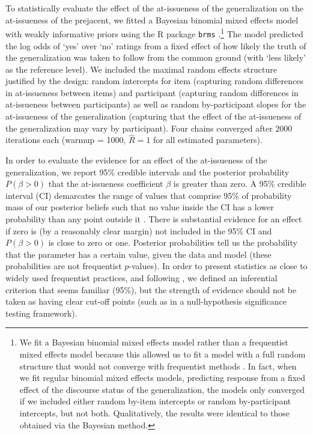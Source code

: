 \documentclass[11pt,fleqn]{article}
\newcommand{\6}{\mbox{$[\hspace*{-.6mm}[$}}
\newcommand{\9}{\mbox{$]\hspace*{-.6mm}]$}}
\begin{document}
To statistically evaluate the effect of the at-issueness of the generalization on the at-issueness of the prejacent, we fitted a Bayesian binomial mixed effects model with weakly informative priors using the R package \verb|brms| \citep{buerkner2017}.\footnote{We fit a Bayesian binomial mixed effects model rather than a frequentist mixed effects model because this allowed us to fit a model with a full random structure that would not converge with frequentist
methods \citep{Nicenboim2016}. In fact, when we fit regular binomial mixed effects models, predicting response from a fixed effect of the discourse status of the generalization, the models only converged if we included either random by-item intercepts or random by-participant intercepts, but not both. Qualitatively, the results were identical to those obtained via the Bayesian method.} The model predicted the log odds of `yes' over `no' ratings from a fixed effect of how likely the truth of the generalization was taken to follow from the common ground (with `less likely' as the reference level). We included the maximal random effects structure justified by the design: random intercepts for item (capturing random differences in at-issueness between items) and participant (capturing random differences in at-issueness between participants) as well as random by-participant slopes for the at-issueness of the generalization (capturing that the effect of the at-issueness of the generalization may vary by participant). Four chains converged after 2000 iterations each (warmup = 1000, \(\hat{R}=1\) for all estimated parameters).

In order to evaluate the evidence for an effect of the at-issueness of the generalization, we report 95\% credible intervals and the posterior probability $P(\beta > 0)$ that the at-issueness coefficient $\beta$ is greater than zero. A 95\% credible interval (CI) demarcates the range of values that comprise 95\% of probability mass of our posterior beliefs such that no value inside the CI has a lower probability than any point outside it \citep{Jaynes1976, Morey2016}. There is substantial evidence for an effect if zero is (by a reasonably clear margin) not included in the 95\% CI and $P(\beta > 0)$ is close to zero or one. Posterior probabilities tell us the probability that the parameter has a certain value, given the data and model (these probabilities are not frequentist $p$-values). In order to present statistics as close to widely used frequentist practices, and following \citealt{Nicenboim2016}, we defined an inferential criterion that seems familiar (95\%), but the strength of evidence should not be taken as having clear cut-off points (such as in a null-hypothesis significance testing framework).
\end{document}

